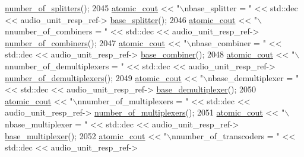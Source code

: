 \begin{DoxyCode}
      \hyperlink{classavdecc__lib_1_1audio__unit__descriptor__response_a2cd4a61129fec7c3f1b37d7a504e2e67}{number\_of\_splitters}();
2045             \hyperlink{cmd__line_8h_a0bc38ccc65c79ba06c6fcd7b4bf554c3}{atomic\_cout} << \textcolor{stringliteral}{"\(\backslash\)nbase\_splitter = "} << std::dec << audio\_unit\_resp\_ref->
      \hyperlink{classavdecc__lib_1_1audio__unit__descriptor__response_a6588160c2bb71ab5bb4159ed2867e38a}{base\_splitter}();
2046             \hyperlink{cmd__line_8h_a0bc38ccc65c79ba06c6fcd7b4bf554c3}{atomic\_cout} << \textcolor{stringliteral}{"\(\backslash\)nnumber\_of\_combiners = "} << std::dec << audio\_unit\_resp\_ref->
      \hyperlink{classavdecc__lib_1_1audio__unit__descriptor__response_ac1a2c85e1ee224b6af5ce5e04183b3b8}{number\_of\_combiners}();
2047             \hyperlink{cmd__line_8h_a0bc38ccc65c79ba06c6fcd7b4bf554c3}{atomic\_cout} << \textcolor{stringliteral}{"\(\backslash\)nbase\_combiner = "} << std::dec << audio\_unit\_resp\_ref->
      \hyperlink{classavdecc__lib_1_1audio__unit__descriptor__response_ad2ed6c298e99279c61cd9bad311a3db4}{base\_combiner}();
2048             \hyperlink{cmd__line_8h_a0bc38ccc65c79ba06c6fcd7b4bf554c3}{atomic\_cout} << \textcolor{stringliteral}{"\(\backslash\)nnumber\_of\_demultiplexers = "} << std::dec << audio\_unit\_resp\_ref->
      \hyperlink{classavdecc__lib_1_1audio__unit__descriptor__response_a1f51a5c28ed8984f4ff5bd36fe74230f}{number\_of\_demultiplexers}();
2049             \hyperlink{cmd__line_8h_a0bc38ccc65c79ba06c6fcd7b4bf554c3}{atomic\_cout} << \textcolor{stringliteral}{"\(\backslash\)nbase\_demultiplexer = "} << std::dec << audio\_unit\_resp\_ref->
      \hyperlink{classavdecc__lib_1_1audio__unit__descriptor__response_ac2b5c1d4b61b5e0819eda852932d1bc4}{base\_demultiplexer}();
2050             \hyperlink{cmd__line_8h_a0bc38ccc65c79ba06c6fcd7b4bf554c3}{atomic\_cout} << \textcolor{stringliteral}{"\(\backslash\)nnumber\_of\_multiplexers = "} << std::dec << audio\_unit\_resp\_ref->
      \hyperlink{classavdecc__lib_1_1audio__unit__descriptor__response_ab9eb22dad38f80e0d6886ac65384ad7e}{number\_of\_multiplexers}();
2051             \hyperlink{cmd__line_8h_a0bc38ccc65c79ba06c6fcd7b4bf554c3}{atomic\_cout} << \textcolor{stringliteral}{"\(\backslash\)nbase\_multiplexer = "} << std::dec << audio\_unit\_resp\_ref->
      \hyperlink{classavdecc__lib_1_1audio__unit__descriptor__response_a0e9b358ce1d3bcadf069b2ba98703be7}{base\_multiplexer}();
2052             \hyperlink{cmd__line_8h_a0bc38ccc65c79ba06c6fcd7b4bf554c3}{atomic\_cout} << \textcolor{stringliteral}{"\(\backslash\)nnumber\_of\_transcoders = "} << std::dec << audio\_unit\_resp\_ref->

\end{DoxyCode}
